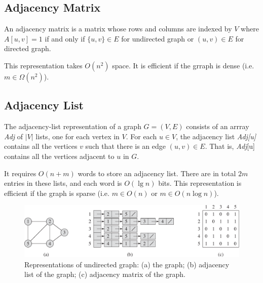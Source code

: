 \subsection{Adjacency Matrix}

\vspace{\parskip}

\begin{definition}
    An adjacency matrix is a matrix whose rows and columns are indexed by $V$ where $A[u,v]=1$ if and only if $\{u,v\} \in E$ for undirected graph or $(u,v) \in E$ for directed graph.
\end{definition}

This representation takes $O(n^2)$ space. It is efficient if the grraph is dense (i.e. $m \in \Omega(n^2)$).

\subsection{Adjacency List}

\vspace{\parskip}

\begin{definition} 
    The adjacency-list representation of a graph $G=(V,E)$ consists of an arrray \textit{Adj} of $|V|$ lists, one for each vertex in $V$. For each $u \in V$, the adjacency list \textit{Adj[u]} contains all the vertices $v$ such that there is an edge $(u,v) \in E$. That is, \textit{Adj}[u] contains all the vertices adjacent to $u$ in $G$.
\end{definition}

It requires $O(n+m)$ words to store an adjacency list. There are in total $2m$ entries in these lists, and each word is $O(\lg n)$ bits. This representation is efficient if the graph is sparse (i.e. $m \in O(n)$ or $m \in O(n \log n)$).

\begin{figure}[htbp]
    \centering
    \includegraphics[width=\linewidth]{figures/undirected_graph.pdf}
    \caption{Representations of undirected graph: (a) the graph; (b) adjacency list of the graph; (c) adjacency matrix of the graph.}
    \label{fig:graph-rep}
\end{figure}

